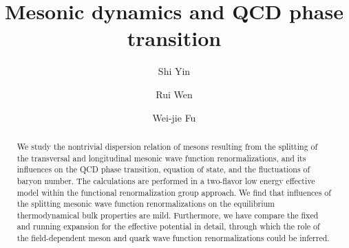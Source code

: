 \documentclass[%
reprint,
superscriptaddress,
showpacs,preprintnumbers,
 amsmath,amssymb,
 aps,
prd,
]{revtex4-1}
\begin{document}
\preprint{}

\title{Mesonic dynamics and QCD phase transition
}

\author{Shi Yin}

\author{Rui Wen}

\author{Wei-jie Fu}


\begin{abstract}

We study the nontrivial dispersion relation of mesons resulting from the splitting of the transversal and longitudinal mesonic wave function renormalizations, and its influences on the QCD phase transition, equation of state, and the fluctuations of baryon number. The calculations are performed in a two-flavor low energy effective model within the functional renormalization group approach. We find that influences of the splitting mesonic wave function renormalizations on the equilibrium thermodynamical bulk properties are mild. Furthermore, we have compare the fixed and running expansion for the effective potential in detail, through which the role of the field-dependent meson and quark wave function renormalizations could be inferred.

\end{abstract}

\maketitle


\end{document}
